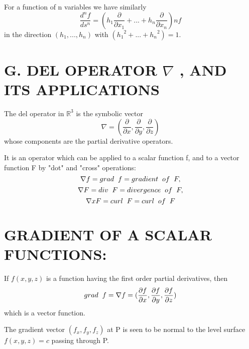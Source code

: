 \documentclass[11 pt]{amsbook}
\begin{document}
\par For a function of n variables we have similarly
\begin{equation}
\frac{d^nf}{ds^n} = {(h_1 \frac{\partial}{\partial x_1}  + ... +  h_n \frac{\partial}{\partial x_n})}n f
\end{equation}
in the direction $(h_1, ... , h_n) $ with $({h_1}^2 + ... + {h_n}^2) = 1$. 
\section{G. DEL OPERATOR $\nabla$ ,  AND ITS APPLICATIONS}
\par The del operator in ${\mathbb{R}}^3$ is the symbolic vector
\begin{equation}
\nabla = ( \frac{\partial}{\partial x} , \frac{\partial}{\partial y} , \frac{\partial}{\partial z})
\end{equation}
whose components are the partial derivative operators.\par
It is an operator which can be applied to a scalar function f, and to a vector function F by "dot" and "cross" operations:
\begin{equation}
\nabla f = grad \hspace{2mm} f = gradient \hspace{2mm} of \hspace{2mm} F,
\end{equation}
\begin{equation}
\nabla F = div \hspace{2mm} F = divergence \hspace{2mm} of \hspace{2mm} F,
\end{equation}
\begin{equation}
\nabla xF = curl \hspace{2mm} F = curl \hspace{2mm} of \hspace{2mm} F
\end{equation}
\section{GRADIENT OF A SCALAR FUNCTIONS:}
\par If $f(x, y, z) $ is a function having the first order partial derivatives, then 
\begin{equation}
grad \hspace{2mm} f = \nabla f = ( \frac{\partial f}{\partial x} , \frac{\partial f}{\partial y} , \frac{\partial f}{\partial z})
\end{equation}
which is a vector function.\par
The gradient vector $(f_x, f_y, f_z) $ at P is seen to be normal to the level surface $f(x, y, z) = c$ passing through P.\par
\end{document}
